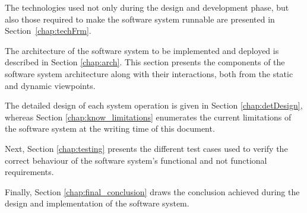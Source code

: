 The technologies used not only during the design and development phase, but 
also those required to make the software system runnable are presented in
Section~\ref{chap:techFrm}.

The architecture of the software system to be implemented and deployed is
described in Section \ref{chap:arch}. This section presents the components of
the software system architecture along with their interactions, both from the static and dynamic viewpoints.

The detailed design of each \gls{system operation} is given in Section
\ref{chap:detDesign}, whereas Section \ref{chap:know_limitations} enumerates the
current limitations of the software system at the writing time of this document.

Next, Section \ref{chap:testing} presents the different test cases used to
verify the correct behaviour of the software system's functional and not functional requirements.

Finally, Section \ref{chap:final_conclusion} draws the
conclusion achieved during the design and implementation of the software system.
 
 